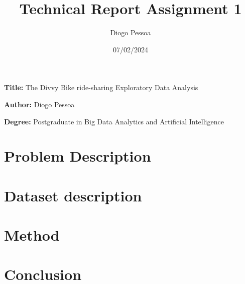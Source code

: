 \documentclass[12pt, a4paper]{article}
\title{Technical Report Assignment 1}
\author{Diogo Pessoa}
\date{07/02/2024}
\newcommand{\namelistlabel}[1]{\mbox{#1}\hfil}
\newenvironment{namelist}[1]{%
    \begin{list}{}
    {
        \let\makelabel\namelistlabel
        \settowidth{\labelwidth}{#1}
        \setlength{\leftmargin}{1.1\labelwidth}
    }
    }{%
    \end{list}}
\begin{document}
    \maketitle
    \begin{namelist}{xxxxxxxxxxxx}
        \item[\textbf{Title:}]
        The Divvy Bike ride-sharing Exploratory Data Analysis
        \item[\textbf{Author:}]
        Diogo Pessoa
        \item[\textbf{Degree:}]
        Postgraduate in Big Data Analytics and Artificial Intelligence
    \end{namelist}

    \section*{Problem Description}
    \label{sec:ProblemDescription}
    

    \section*{Dataset description}
    \label{sec:dataset}
    

    \section*{Method}\label{sec:method}
    

    \section*{Conclusion}\label{sec:conclusion}
    
\end{document}
